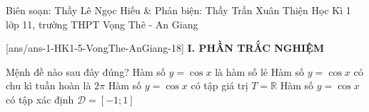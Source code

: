 	\begin{name}
{Biên soạn: Thầy Lê Ngọc Hiếu \& Phản biện: Thầy Trần Xuân Thiện}
		{Học Kì 1 lớp 11, trường THPT Vọng Thê - An Giang}
	\end{name}
	\setcounter{ex}{0}\setcounter{bt}{0}
	[ans/ans-1-HK1-5-VongThe-AnGiang-18]
\noindent\textbf{I. PHẦN TRẮC NGHIỆM}
\begin{ex}%
	Mệnh đề nào sau đây đúng?
	\choice
	{Hàm số $y=\cos x$ là hàm số lẻ}
	{\True Hàm số $y=\cos x$ có chu kì tuần hoàn là $2\pi$}
	{Hàm số $y=\cos x$ có tập giá trị $T=\mathbb{R}$}
	{Hàm số $y=\cos x$ có tập xác định $\mathscr{D}=[-1;1]$}
\end{ex}

